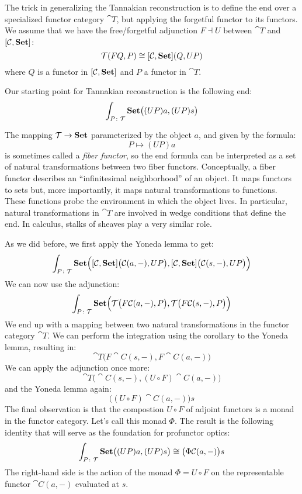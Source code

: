 \documentclass[DaoFP]{subfiles}
\begin{document}
The trick in generalizing the Tannakian reconstruction is to define the end over a specialized functor category $\cat T$, 
 but applying the forgetful functor to its functors. We assume that we have the free/forgetful adjunction $F \dashv U$ between $\cat T$ and $[\mathcal{C}, \mathbf{Set}]$:
\[ \mathcal{T} (F Q, P) \cong  [\mathcal{C}, \mathbf{Set}] ( Q, U P )\]
where $Q$ is a functor in $[\mathcal{C}, \mathbf{Set}]$ and $P$ a functor in $\cat T$.

Our starting point for Tannakian reconstruction is the following end:
\[ \int_{P \colon \mathcal{T}} \mathbf{Set} \big((U P) a, (U P) s\big) \]

The mapping $\mathcal{T} \to \mathbf{Set}$ parameterized by the object $a$, and given by the formula:
\[ P \mapsto (U P) a \]
is sometimes called a \emph{fiber functor}, so the end formula can be interpreted as a set of natural transformations between two fiber functors. Conceptually, a fiber functor describes an ``infinitesimal neighborhood'' of an object. It maps functors to sets but, more importantly, it maps natural transformations to functions. These functions probe the environment in which the object lives. In particular, natural transformations in $\cat T$ are involved in wedge conditions that define the end. In calculus, stalks of sheaves play a very similar role.

As we did before, we first apply the Yoneda lemma to get:
\[ \int_{P \colon \mathcal{T}} \mathbf{Set} \Big([\mathcal{C}, \mathbf{Set}] \big( \mathcal{C} (a ,-), U P\big), [\mathcal{C}, \mathbf{Set}] \big( \mathcal{C} (s ,-), U P\big)\Big) \]
We can now use the adjunction:
\[ \int_{P \colon \mathcal{T}} \mathbf{Set} \Big(\mathcal{T} \big( F \mathcal{C} (a ,-), P\big), \mathcal{T} \big( F \mathcal{C} (s ,-), P\big)\Big) \]
We end up with a mapping between two natural transformations in the functor category $\cat T$. We can perform the integration using the corollary to the Yoneda lemma, resulting in:
\[ \cat T\big( F \cat C (s ,-), F \cat C (a ,-) \big) \]
We can apply the adjunction once more:
\[ \cat T\big( \cat C (s ,-), (U\circ F) \cat C (a ,-) \big) \]
and the Yoneda lemma again:
\[ \big( (U\circ F) \cat C (a ,-) \big) s \]
The final observation is that the compostion $U \circ F$ of adjoint functors is a monad in the functor category. Let's call this monad $\Phi$. The result is the following identity that will serve as the foundation for profunctor optics:
\[ \int_{P \colon \mathcal{T}} \mathbf{Set} \big((U P) a, (U P) s\big) \cong \big( \Phi \mathcal{C} (a ,-) \big) s \]
The right-hand side is the action of the monad $\Phi = U \circ F$ on the representable functor $\cat C (a, -)$ evaluated at $s$. 
\end{document}
